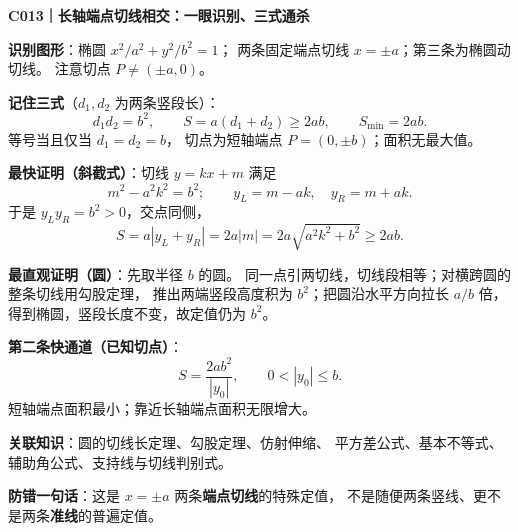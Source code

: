 \begin{summarybox}
\textbf{C013｜长轴端点切线相交：一眼识别、三式通杀}

\textbf{识别图形}：椭圆 $x^2/a^2+y^2/b^2=1$；
两条固定端点切线 $x=\pm a$；第三条为椭圆动切线。
注意切点 $P\ne(\pm a,0)$。

\textbf{记住三式}（$d_1,d_2$ 为两条竖段长）：
\[
\boxed{d_1d_2=b^2},\qquad
\boxed{S=a(d_1+d_2)\ge2ab},\qquad
\boxed{S_{\min}=2ab}.
\]
等号当且仅当 $d_1=d_2=b$，
切点为短轴端点 $P=(0,\pm b)$；面积无最大值。

\textbf{最快证明（斜截式）}：切线 $y=kx+m$ 满足
\[
m^2-a^2k^2=b^2;\qquad
 y_L=m-ak,\quad y_R=m+ak.
\]
于是 $y_Ly_R=b^2>0$，交点同侧，
\[
S=a|y_L+y_R|=2a|m|
=2a\sqrt{a^2k^2+b^2}\ge2ab.
\]

\textbf{最直观证明（圆）}：先取半径 $b$ 的圆。
同一点引两切线，切线段相等；对横跨圆的整条切线用勾股定理，
推出两端竖段高度积为 $b^2$；把圆沿水平方向拉长 $a/b$ 倍，
得到椭圆，竖段长度不变，故定值仍为 $b^2$。

\textbf{第二条快通道（已知切点）}：
\[
\boxed{S=\frac{2ab^2}{|y_0|}},\qquad 0<|y_0|\le b.
\]
短轴端点面积最小；靠近长轴端点面积无限增大。

\textbf{关联知识}：圆的切线长定理、勾股定理、仿射伸缩、
平方差公式、基本不等式、辅助角公式、支持线与切线判别式。

\textbf{防错一句话}：这是 $x=\pm a$ 两条\textbf{端点切线}的特殊定值，
不是随便两条竖线、更不是两条\textbf{准线}的普遍定值。
\end{summarybox}
